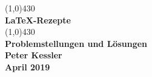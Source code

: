 \begin{center}
  \vspace*{5.5cm}
  \line(1,0){430}\\
  [8mm]
  \Huge \textbf{\LaTeX-Rezepte} \\
  [2mm]
  \line(1,0){430}\\
  \vspace{1.5cm}
  \LARGE\textbf{Problemstellungen und Lösungen}\\
  \vspace{1.5cm}
  \Large\textbf{Peter Kessler}\\  
  \Large\textbf{April 2019}\\  
  \vfill
\end{center}
